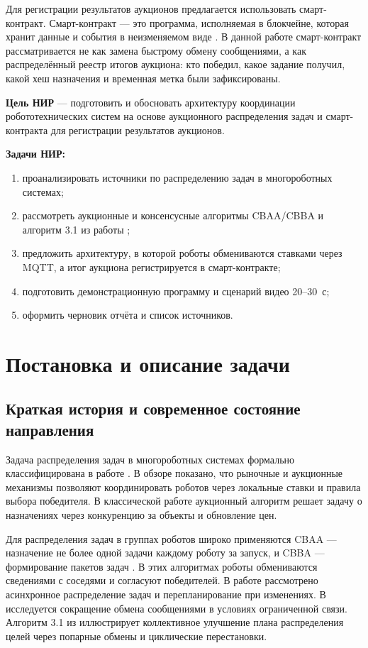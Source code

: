 \documentclass[14pt,a4paper]{extarticle}
\begin{document}
	Для регистрации результатов аукционов предлагается использовать смарт-контракт. Смарт-контракт — это программа, исполняемая в блокчейне, которая хранит данные и события в неизменяемом виде \cite{buterin2014,solidity}. В данной работе смарт-контракт рассматривается не как замена быстрому обмену сообщениями, а как распределённый реестр итогов аукциона: кто победил, какое задание получил, какой хеш назначения и временная метка были зафиксированы.
	
	\textbf{Цель НИР} — подготовить и обосновать архитектуру координации робототехнических систем на основе аукционного распределения задач и смарт-контракта для регистрации результатов аукционов.
	
	\textbf{Задачи НИР:}
	\begin{enumerate}
		\item проанализировать источники по распределению задач в многороботных системах;
		\item рассмотреть аукционные и консенсусные алгоритмы CBAA/CBBA и алгоритм 3.1 из работы \cite{kalyaev2009};
		\item предложить архитектуру, в которой роботы обмениваются ставками через MQTT, а итог аукциона регистрируется в смарт-контракте;
		\item подготовить демонстрационную программу и сценарий видео 20--30~с;
		\item оформить черновик отчёта и список источников.
	\end{enumerate}
	
	\clearpage
	\section{Постановка и описание задачи}
	
	\subsection{Краткая история и современное состояние направления}
	
	Задача распределения задач в многороботных системах формально классифицирована в работе \cite{gerkey2004}. В обзоре \cite{dias2006} показано, что рыночные и аукционные механизмы позволяют координировать роботов через локальные ставки и правила выбора победителя. В классической работе \cite{bertsekas1988} аукционный алгоритм решает задачу о назначениях через конкуренцию за объекты и обновление цен.
	
	Для распределения задач в группах роботов широко применяются CBAA — назначение не более одной задачи каждому роботу за запуск, и CBBA — формирование пакетов задач \cite{choi2009,brunet2008}. В этих алгоритмах роботы обмениваются сведениями с соседями и согласуют победителей. В работе \cite{johnson2011} рассмотрено асинхронное распределение задач и перепланирование при изменениях. В \cite{raja2022} исследуется сокращение обмена сообщениями в условиях ограниченной связи. Алгоритм 3.1 из \cite{kalyaev2009} иллюстрирует коллективное улучшение плана распределения целей через попарные обмены и циклические перестановки.
	
\end{document}
